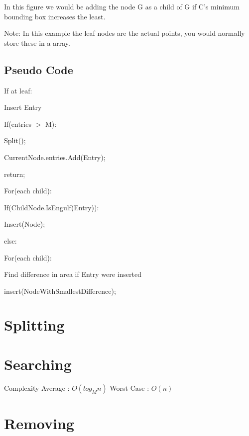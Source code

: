 \documentclass{article}
\begin{document}
In this figure we would be adding the node G as a child of G
if C's minimum bounding box increases the least.

Note: In this example the leaf nodes are the actual points, you would normally store these in a array.
\subsection*{Pseudo Code}
\begin{flushleft}

    
If at leaf:

\quad Insert Entry

\quad If(entries $>$ M):

\quad \quad Split();

\quad CurrentNode.entries.Add(Entry);

\quad return;


For(each child):


\quad If(ChildNode.IsEngulf(Entry)):

 \quad \quad Insert(Node);


else:

\quad For(each child):

    \quad \quad
    Find difference in area if Entry were inserted

    \quad insert(NodeWithSmallestDifference);
\end{flushleft}

\section{Splitting} 

\section{Searching}
Complexity
Average : $O(log_Mn)$
Worst Case : $O(n)$

\section{Removing}
\end{document}
